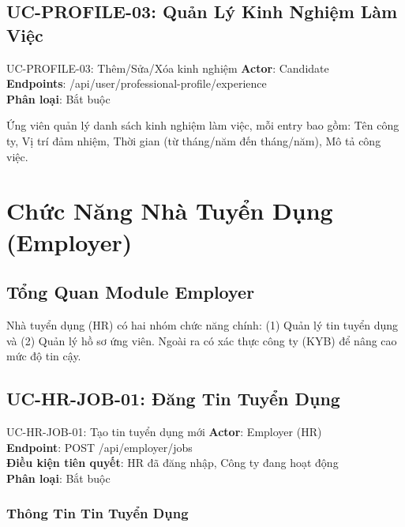 \documentclass[12pt, a4paper]{report}
\begin{document}
\section{UC-PROFILE-03: Quản Lý Kinh Nghiệm Làm Việc}

\begin{requirementbox}{UC-PROFILE-03: Thêm/Sửa/Xóa kinh nghiệm}
\textbf{Actor}: Candidate \\
\textbf{Endpoints}: /api/user/professional-profile/experience \\
\textbf{Phân loại}: Bắt buộc
\end{requirementbox}

Ứng viên quản lý danh sách kinh nghiệm làm việc, mỗi entry bao gồm: Tên công ty, Vị trí đảm nhiệm, Thời gian (từ tháng/năm đến tháng/năm), Mô tả công việc.

\chapter{Chức Năng Nhà Tuyển Dụng (Employer)}

\section{Tổng Quan Module Employer}

Nhà tuyển dụng (HR) có hai nhóm chức năng chính: (1) Quản lý tin tuyển dụng và (2) Quản lý hồ sơ ứng viên. Ngoài ra có xác thực công ty (KYB) để nâng cao mức độ tin cậy.

\section{UC-HR-JOB-01: Đăng Tin Tuyển Dụng}

\begin{requirementbox}{UC-HR-JOB-01: Tạo tin tuyển dụng mới}
\textbf{Actor}: Employer (HR) \\
\textbf{Endpoint}: POST /api/employer/jobs \\
\textbf{Điều kiện tiên quyết}: HR đã đăng nhập, Công ty đang hoạt động \\
\textbf{Phân loại}: Bắt buộc
\end{requirementbox}

\subsection{Thông Tin Tin Tuyển Dụng}
\end{document}

